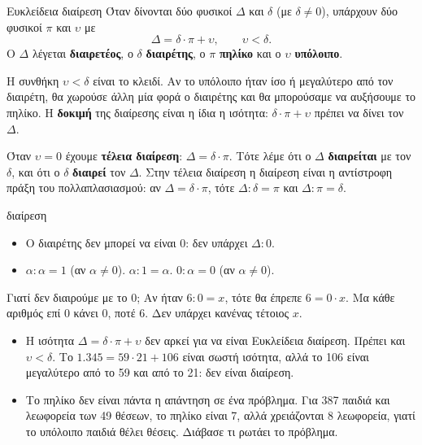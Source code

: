 
\begin{orismos}{Ευκλείδεια διαίρεση}
Όταν δίνονται δύο φυσικοί $\Delta$ και $\delta$ (με $\delta\neq 0$), υπάρχουν δύο φυσικοί $\pi$ και $\upsilon$ με
$$\Delta=\delta\cdot\pi+\upsilon,\qquad \upsilon<\delta.$$
Ο $\Delta$ λέγεται \textbf{διαιρετέος}, ο $\delta$ \textbf{διαιρέτης}, ο $\pi$ \textbf{πηλίκο} και ο $\upsilon$ \textbf{υπόλοιπο}.
\end{orismos}

Η συνθήκη $\upsilon<\delta$ είναι το κλειδί. Αν το υπόλοιπο ήταν ίσο ή μεγαλύτερο από τον διαιρέτη, θα χωρούσε άλλη μία φορά ο διαιρέτης και θα μπορούσαμε να αυξήσουμε το πηλίκο. Η \textbf{δοκιμή} της διαίρεσης είναι η ίδια η ισότητα: $\delta\cdot\pi+\upsilon$ πρέπει να δίνει τον $\Delta$.

Όταν $\upsilon=0$ έχουμε \textbf{τέλεια διαίρεση}: $\Delta=\delta\cdot\pi$. Τότε λέμε ότι ο $\Delta$ \textbf{διαιρείται} με τον $\delta$, και ότι ο $\delta$ \textbf{διαιρεί} τον $\Delta$. Στην τέλεια διαίρεση η διαίρεση είναι η αντίστροφη πράξη του πολλαπλασιασμού: αν $\Delta=\delta\cdot\pi$, τότε $\Delta:\delta=\pi$ και $\Delta:\pi=\delta$.

\begin{idiotita}{διαίρεση}
\begin{itemize}[leftmargin=1.2em,itemsep=0.2ex,topsep=2pt]
\item Ο διαιρέτης δεν μπορεί να είναι 0: δεν υπάρχει $\Delta:0$.
\item $\alpha:\alpha=1$ (αν $\alpha\neq 0$). \quad $\alpha:1=\alpha$. \quad $0:\alpha=0$ (αν $\alpha\neq 0$).
\end{itemize}
\end{idiotita}

Γιατί δεν διαιρούμε με το 0; Αν ήταν $6:0=x$, τότε θα έπρεπε $6=0\cdot x$. Μα κάθε αριθμός επί 0 κάνει 0, ποτέ 6. Δεν υπάρχει κανένας τέτοιος $x$.

\begin{prosoxi}
\begin{itemize}[leftmargin=1.2em,itemsep=0.3ex,topsep=2pt]
\item Η ισότητα $\Delta=\delta\cdot\pi+\upsilon$ δεν αρκεί για να είναι Ευκλείδεια διαίρεση. Πρέπει και $\upsilon<\delta$. Το $1.345=59\cdot 21+106$ είναι σωστή ισότητα, αλλά το 106 είναι μεγαλύτερο από το 59 και από το 21: δεν είναι διαίρεση.
\item Το πηλίκο δεν είναι πάντα η απάντηση σε ένα πρόβλημα. Για 387 παιδιά και λεωφορεία των 49 θέσεων, το πηλίκο είναι 7, αλλά χρειάζονται 8 λεωφορεία, γιατί το υπόλοιπο παιδιά θέλει θέσεις. Διάβασε τι ρωτάει το πρόβλημα.
\end{itemize}
\end{prosoxi}

